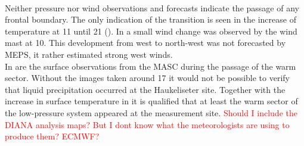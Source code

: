 \\
Neither pressure nor wind observations and forecasts indicate the passage of any frontal boundary. The only indication of the transition is seen in the increase of temperature at \SI{11}{\UTC} until \SI{21}{\UTC} (). In  a small wind change was observed by the wind mast at \SI{10}{\UTC}. This development from west to north-west was not forecasted by MEPS, it rather estimated strong west winds.
\\
In  are the surface observations from the MASC during the passage of the warm sector. Without the images taken around \SI{17}{\UTC} it would not be possible to verify that liquid precipitation occurred at the Haukeliseter site. Together with the increase in surface temperature in  it is qualified that at least the warm sector of the low-pressure system appeared at the measurement site.
\textcolor{red}{Should I include the DIANA analysis maps? But I dont know what the meteorologists are using to produce them? ECMWF?}
%
